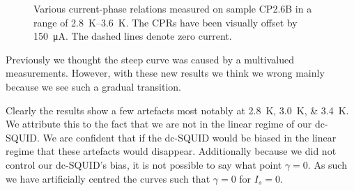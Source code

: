 \begin{figure}[ht!]
	\centering
	
	\caption{Various current-phase relations measured on sample CP2.6B in a range of \qtyrange{2.8}{3.6}{\kelvin}. The CPRs have been visually offset by \qty{150}{\micro\ampere}. The dashed lines denote zero current.}
	\label{fig:CP2.6B_revisited_CPRs}
\end{figure}

Previously we thought the steep curve was caused by a multivalued measurements. However, with these new results we think we wrong mainly because we see such a gradual transition.

Clearly the results show a few artefacts most notably at \qtylist{2.8;3.0;3.4}{\kelvin}. We attribute this to the fact that we are not in the linear regime of our dc-SQUID. We are confident that if the dc-SQUID would be biased in the linear regime that these artefacts would disappear. Additionally because we did not control our dc-SQUID's bias, it is not possible to say what point $\gamma = 0$. As such we have artificially centred the curves such that $\gamma = 0$ for $I_s=0$.
